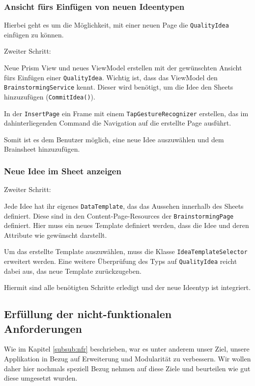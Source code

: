 \subsubsection{Ansicht fürs Einfügen von neuen Ideentypen}
Hierbei geht es um die Möglichkeit, mit einer neuen Page die \texttt{QualityIdea} einfügen zu können.

\begin{labeling}{Zweiter Schritt:}
	\item[Erster Schritt:]	Neue Prism View und neues ViewModel erstellen mit der gewünschten Ansicht fürs Einfügen einer \texttt{QualityIdea}. Wichtig ist, dass das ViewModel den \texttt{Brainstorming\-Service} kennt. Dieser wird benötigt, um die Idee den Sheets hinzuzufügen (\texttt{CommitIdea()}). 
	\item[Zweiter Schritt:] In der \texttt{InsertPage} ein Frame mit einem \texttt{TapGestureRecognizer} erstellen, das im dahinterliegenden Command die Navigation auf die erstellte Page ausführt.
\end{labeling}

Somit ist es dem Benutzer möglich, eine neue Idee auszuwählen und dem Brainsheet hinzuzufügen. 

\subsubsection{Neue Idee im Sheet anzeigen}
\begin{labeling}{Zweiter Schritt:}
	\item[Erster Schritt:] Jede Idee hat ihr eigenes \texttt{DataTemplate}, das das Aussehen innerhalb des Sheets definiert. Diese sind in den Content-Page-Resources der \texttt{Brain\-storming\-Page} definiert. Hier muss ein neues Template definiert werden, dass die Idee und deren Attribute wie gewünscht darstellt. 
	\item[Zweiter Schritt:] Um das erstellte Template auszuwählen, muss die Klasse \texttt{Idea\-Template\-Selector} erweitert werden. Eine weitere Überprüfung des Typs auf \texttt{Qua\-lity\-Idea} reicht dabei aus, das neue Template zurückzugeben.
\end{labeling}

Hiermit sind alle benötigten Schritte erledigt und der neue Ideentyp ist integriert. 


\subsection{Erfüllung der nicht-funktionalen Anforderungen} 
Wie im Kapitel \ref{subsub:nfr} beschrieben, war es unter anderem unser Ziel, unsere Applikation in Bezug auf Erweiterung und Modularität zu verbessern. Wir wollen daher hier nochmals speziell Bezug nehmen auf diese Ziele und beurteilen wie gut diese umgesetzt wurden.

